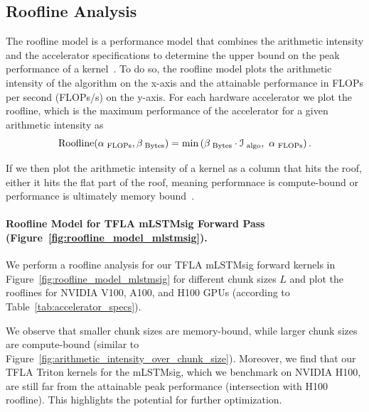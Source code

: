 \documentclass{article}
\begin{document}
    \subsection{Roofline Analysis}
    \label{app:roofline_analysis_mlstmsig}
    \vspace{-0.1cm}
    The roofline model is a performance model that combines the arithmetic intensity and the accelerator specifications to determine the upper bound on the peak performance of a kernel~\citep{williams:09rooflineanalysis}.
    To do so, the roofline model plots the arithmetic intensity of the algorithm on the x-axis and the attainable performance in FLOPs per second (FLOPs/s) on the y-axis.
    For each hardware accelerator we plot the roofline, which is the maximum performance of the accelerator for a given arithmetic intensity as 
    \begin{equation}
        \text{Roofline}(\accflops{}, \accbytes{}) = \min\left( \accbytes{} \cdot \mathcal{I}_\text{ algo}, \ \accflops{}\right).
    \end{equation}

    If we then plot the arithmetic intensity of a kernel as a column that hits the roof, either it hits the flat part of the roof, meaning performnace is compute-bound or performance is ultimately memory bound~\cite{williams:09rooflineanalysis}. 

    \paragraph{Roofline Model for TFLA mLSTMsig Forward Pass (Figure~\ref{fig:roofline_model_mlstmsig}).}
    We perform a roofline analysis for our TFLA mLSTMsig forward kernels in Figure~\ref{fig:roofline_model_mlstmsig} for different chunk sizes $L$ and plot the rooflines for NVIDIA V100, A100, and H100 GPUs (according to Table~\ref{tab:accelerator_specs}).

    We observe that smaller chunk sizes are memory-bound, while larger chunk sizes are compute-bound (similar to Figure~\ref{fig:arithmetic_intensity_over_chunk_size}). 
    Moreover, we find that our TFLA Triton kernels for the mLSTMsig, which we benchmark on NVIDIA H100, are still far from the attainable peak performance (intersection with H100 roofline). This highlights the potential for further optimization.
\end{document}
